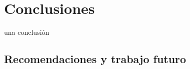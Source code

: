 
\chapter{Conclusiones}

una conclusi\'on

\section{Recomendaciones y trabajo futuro}

%



\endinput 